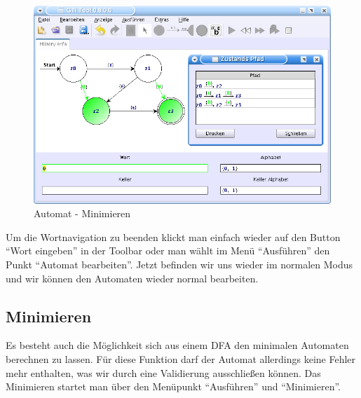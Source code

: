     \begin{figure}[h]
  \begin{center}
  \includegraphics[width=12cm]{images/history_path.png}
  \caption{Automat - Minimieren}
  \end{center}
  \end{figure}
  
  Um die Wortnavigation zu beenden klickt man einfach wieder auf den Button
  "`Wort eingeben"' in der Toolbar oder man wählt im Menü "`Ausführen"' den
  Punkt "`Automat bearbeiten"'. Jetzt befinden wir uns wieder im normalen Modus
  und wir können den Automaten wieder normal bearbeiten.
   
\subsection{Minimieren}
  
  Es besteht auch die Möglichkeit sich aus einem DFA den minimalen Automaten
  berechnen zu lassen. Für diese Funktion darf der Automat allerdings keine
  Fehler mehr enthalten, was wir durch eine Validierung ausschließen können. Das
  Minimieren startet man über den Menüpunkt "`Ausführen"' und
  "`Minimieren"'.\vspace{10pt}
  
